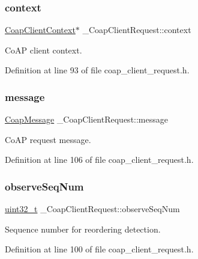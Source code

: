 \subsubsection{\texorpdfstring{context}{context}}
{\footnotesize\ttfamily \hyperlink{coap__client_8h_a3b7ac08b734045846f1dba69cd6b8700}{Coap\+Client\+Context}$\ast$ \+\_\+\+Coap\+Client\+Request\+::context}



Co\+AP client context. 



Definition at line 93 of file coap\+\_\+client\+\_\+request.\+h.

\mbox{\label{struct__CoapClientRequest_afbf9d205858ab6a1a64deb97d3141f10}} 
\subsubsection{\texorpdfstring{message}{message}}
{\footnotesize\ttfamily \hyperlink{structCoapMessage}{Coap\+Message} \+\_\+\+Coap\+Client\+Request\+::message}



Co\+AP request message. 



Definition at line 106 of file coap\+\_\+client\+\_\+request.\+h.

\mbox{\label{struct__CoapClientRequest_a492e4c38257c6ed5fac3831e1b4c686b}} 
\subsubsection{\texorpdfstring{observe\+Seq\+Num}{observeSeqNum}}
{\footnotesize\ttfamily \hyperlink{stdint_8h_a435d1572bf3f880d55459d9805097f62}{uint32\+\_\+t} \+\_\+\+Coap\+Client\+Request\+::observe\+Seq\+Num}



Sequence number for reordering detection. 



Definition at line 100 of file coap\+\_\+client\+\_\+request.\+h.

